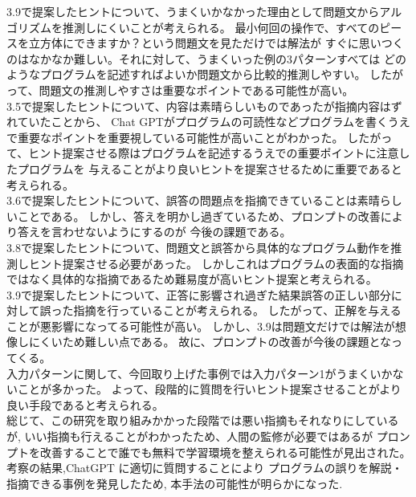  3.9で提案したヒントについて、うまくいかなかった理由として問題文からアルゴリズムを推測しにくいことが考えられる。
最小何回の操作で、すべてのピースを立方体にできますか？という問題文を見ただけでは解法が
すぐに思いつくのはなかなか難しい。それに対して、うまくいった例の3パターンすべては
どのようなプログラムを記述すればよいか問題文から比較的推測しやすい。
したがって、問題文の推測しやすさは重要なポイントである可能性が高い。\\
 3.5で提案したヒントについて、内容は素晴らしいものであったが指摘内容はずれていたことから、
Chat GPTがプログラムの可読性などプログラムを書くうえで重要なポイントを重要視している可能性が高いことがわかった。
したがって、ヒント提案させる際はプログラムを記述するうえでの重要ポイントに注意したプログラムを
与えることがより良いヒントを提案させるために重要であると考えられる。\\
 3.6で提案したヒントについて、誤答の問題点を指摘できていることは素晴らしいことである。
しかし、答えを明かし過ぎているため、プロンプトの改善により答えを言わせないようにするのが
今後の課題である。\\
 3.8で提案したヒントについて、問題文と誤答から具体的なプログラム動作を推測しヒント提案させる必要があった。
しかしこれはプログラムの表面的な指摘ではなく具体的な指摘であるため難易度が高いヒント提案と考えられる。\\
 3.9で提案したヒントについて、正答に影響され過ぎた結果誤答の正しい部分に対して誤った指摘を行っていることが考えられる。
したがって、正解を与えることが悪影響になってる可能性が高い。
しかし、3.9は問題文だけでは解法が想像しにくいため難しい点である。
故に、プロンプトの改善が今後の課題となってくる。\\
 入力パターンに関して、今回取り上げた事例では入力パターン1がうまくいかないことが多かった。
よって、段階的に質問を行いヒント提案させることがより良い手段であると考えられる。\\
 総じて、この研究を取り組みかかった段階では悪い指摘もそれなりにしているが,
いい指摘も行えることがわかったため、人間の監修が必要ではあるが
プロンプトを改善することで誰でも無料で学習環境を整えられる可能性が見出された。
考察の結果,ChatGPT に適切に質問することにより
プログラムの誤りを解説・指摘できる事例を発見したため,
本手法の可能性が明らかになった.

